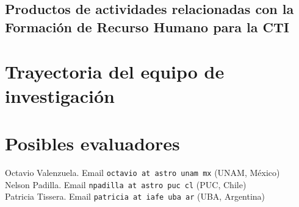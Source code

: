 \documentclass[spanish,notitlepage,letterpaper,11pt]{article} %
\begin{document}

\subsection{Productos de actividades relacionadas con la Formación de Recurso
Humano para la CTI }



\section{Trayectoria del equipo de investigaci\'on}


\section{Posibles evaluadores}

\noindent
Octavio Valenzuela. Email {\texttt{octavio at astro unam mx}} (UNAM, M\'exico)\\
Nelson Padilla. Email {\texttt{npadilla at astro puc cl}} (PUC, Chile)\\
Patricia Tissera. Email {\texttt{patricia at iafe uba ar}} (UBA, Argentina)\\
\end{document}
